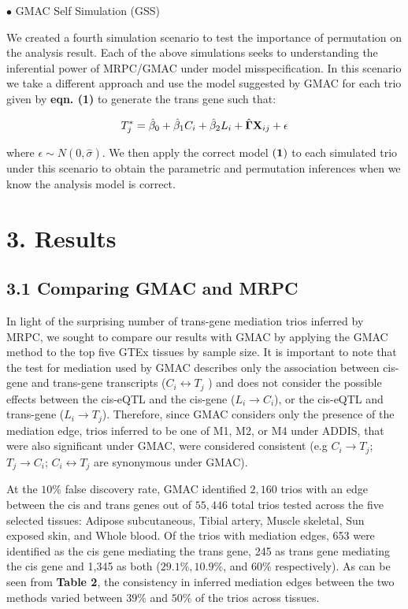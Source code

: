\documentclass[
]{article}
\begin{document}
\indent \(\bullet\) GMAC Self Simulation (GSS)

We created a fourth simulation scenario to test the importance of
permutation on the analysis result. Each of the above simulations seeks
to understanding the inferential power of MRPC/GMAC under model
misspecification. In this scenario we take a different approach and use
the model suggested by GMAC for each trio given by \textbf{eqn. (1)} to
generate the trans gene such that:

\[ T_j^{\ast} = \hat{\beta}_0 + \hat{\beta}_1 C_i + \hat{\beta}_2 L_i + \hat{{\bf \Gamma}} {\bf X}_{ij} + \epsilon  \]

where \(\epsilon \sim N(0, \hat{\sigma})\). We then apply the correct
model \({\bf (1)}\) to each simulated trio under this scenario to obtain
the parametric and permutation inferences when we know the analysis
model is correct.

\section*{3. Results}
\subsection*{3.1 Comparing GMAC and MRPC}

In light of the surprising number of trans-gene mediation trios inferred
by MRPC, we sought to compare our results with GMAC by applying the GMAC
method to the top five GTEx tissues by sample size. It is important to
note that the test for mediation used by GMAC describes only the
association between cis-gene and trans-gene transcripts
(\(C_i \leftrightarrow T_j\) ) and does not consider the possible
effects between the cis-eQTL and the cis-gene (\(L_i \rightarrow C_i\)),
or the cis-eQTL and trans-gene (\(L_i \rightarrow T_j\)). Therefore,
since GMAC considers only the presence of the mediation edge, trios
inferred to be one of M1, M2, or M4 under ADDIS, that were also
significant under GMAC, were considered consistent (e.g
\(C_i \rightarrow T_j\); \(T_j \rightarrow C_i\);
\(C_i \leftrightarrow T_j\) are synonymous under GMAC).

At the \(10\%\) false discovery rate, GMAC identified \(2,160\) trios
with an edge between the cis and trans genes out of \(55,446\) total
trios tested across the five selected tissues: Adipose subcutaneous,
Tibial artery, Muscle skeletal, Sun exposed skin, and Whole blood. Of
the trios with mediation edges, 653 were identified as the cis gene
mediating the trans gene, 245 as trans gene mediating the cis gene and
1,345 as both (\(29.1\%, 10.9\%\), and \(60\%\) respectively). As can be
seen from \textbf{Table 2}, the consistency in inferred mediation edges
between the two methods varied between \(39\%\) and \(50\%\) of the
trios across tissues.
\end{document}
